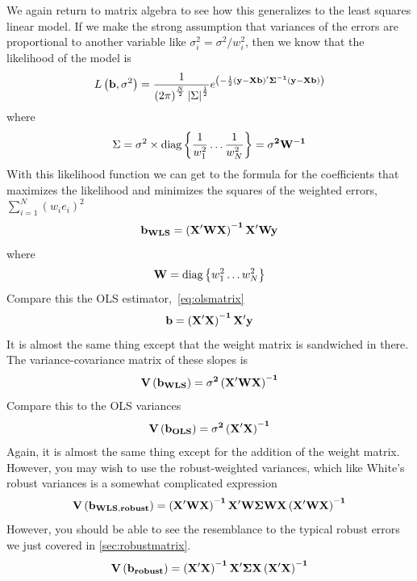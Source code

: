 We again return to matrix algebra to see how this generalizes to the least squares linear model. If we make the strong assumption that variances of the errors are proportional to another variable like $\sigma_i^2=\sigma^2/w_i^2$, then we know that the likelihood of the model is
\begin{equation}
L\left({\bf b},\sigma^2\right)=\frac{1}{\left(2\pi\right)^{\frac{N}{2}}\left|\Sigma\right|^{\frac{1}{2}}}e^{\left(-\frac{1}{2}\bf{\left(y-Xb\right)'\Sigma^{-1}\left(y-Xb\right)}\right)}
\end{equation}
where
\begin{equation}
\Sigma = \sigma^2\times \mbox{diag}\left\{\frac{1}{w_1^2}\ldots\frac{1}{w_N^2}\right\}={\bf \sigma^2W^{-1}}
\end{equation}
With this likelihood function we can get to the formula for the coefficients that maximizes the likelihood and minimizes the squares of the weighted errors, $\sum_{i=1}^N\left(w_ie_i\right)^2$
\begin{equation}
\bf b_{WLS}=\left(X'WX\right)^{-1}X'Wy
\end{equation}
where
\begin{equation}
{\bf W} = \mbox{diag}\left\{w_1^2\ldots w_N^2\right\}
\end{equation}
Compare this the OLS estimator,~\eqref{eq:olsmatrix}
\[
{\bf{b=\left(X'X\right)^{-1}X'y}}
\]
It is almost the same thing except that the weight matrix is sandwiched in there. The variance-covariance matrix of these slopes is
\begin{equation}
\bf V\left(b_{WLS}\right)=\sigma^2\left(X'WX\right)^{-1}
\end{equation}
Compare this to the OLS variances
\begin{equation}
\bf V\left(b_{OLS}\right)=\sigma^2\left(X'X\right)^{-1}
\end{equation}
Again, it is almost the same thing except for the addition of the weight matrix. However, you may wish to use the robust-weighted variances, which like White's robust variances is a somewhat complicated expression
\begin{equation}
\bf V\left(b_{WLS, robust}\right)=\left(X'WX\right)^{-1}X'W\Sigma WX\left(X'WX\right)^{-1}
\end{equation}
However, you should be able to see the resemblance to the typical robust errors we just covered in \ref{sec:robustmatrix}.
\begin{equation}
\bf V\left(b_{robust}\right)=\left(X'X\right)^{-1}X'\Sigma X\left(X'X\right)^{-1}
\end{equation}
